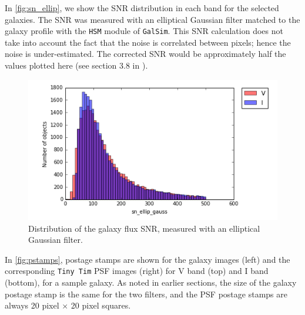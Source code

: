 \documentclass[a4paper,11pt]{article}
\begin{document}
In \autoref{fig:sn_ellip}, we show the SNR distribution in each band for the selected galaxies. 
The SNR was measured with an elliptical Gaussian filter matched to the galaxy profile with the {\tt HSM} module of {\tt GalSim}. 
This SNR calculation does not take into account the fact that the noise is correlated between pixels; hence the noise is under-estimated.  
The corrected SNR would be approximately half the values plotted here (see section 3.8 in \cite{Leauthaud2007}).

\begin{figure}[h]
\centering\includegraphics[width=0.9\linewidth]{sn_ellip_all.png}
\caption{Distribution of the galaxy flux SNR,  measured with an elliptical Gaussian filter.}
\label{fig:sn_ellip}
\end{figure}

In \autoref{fig:pstamps}, postage stamps are shown for the galaxy images (left) and the corresponding {\tt Tiny Tim} PSF images (right) for V band (top) and I band (bottom), for a sample galaxy. 
As noted in earlier sections, the size of the galaxy postage stamp is the same for the two filters, and the PSF postage stamps are always 20 pixel $\times$ 20 pixel squares. 
\end{document}

